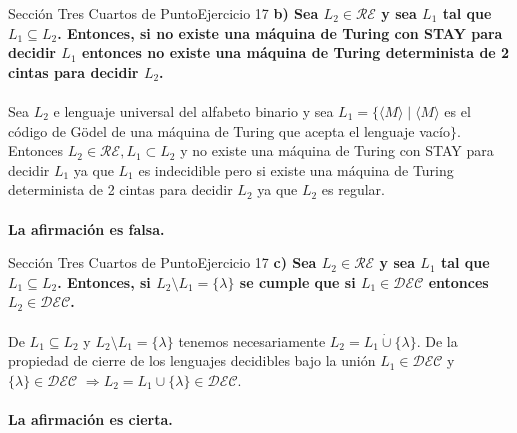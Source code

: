 \documentclass[10pt, envcountsect, presentation, aspectratio=169]{beamer}
\newcommand{\ld}{\ensuremath{\mathcal {DEC}}}
\newcommand{\lr}{\ensuremath{\mathcal {RE}}}
\begin{document}
\begin{frame}{Sección Tres Cuartos de Punto}{Ejercicio 17}
    \textbf{b) Sea $L_2 \in \lr$ y sea $L_1$ tal que $L_1 \subseteq L_2$. Entonces, si no  existe una máquina de Turing con  STAY para decidir $L_1$ entonces no existe una máquina de Turing determinista de 2 cintas para decidir $L_2$.}\\~\\

    Sea $L_2$ e lenguaje universal del alfabeto binario y sea $L_1=\{ \langle M \rangle \mid \langle M \rangle$ es el código de Gödel de una máquina de Turing que acepta el lenguaje vacío$\}$.
    Entonces $L_2 \in \mathcal{RE}, L_1 \subset L_2$ y no existe una máquina de Turing con STAY para decidir $L_1$ ya que $L_1$ es indecidible pero si existe una máquina de Turing determinista de 2 cintas para decidir $L_2$ ya que $L_2$ es regular.\\~\\

    \textbf{La afirmación es falsa.}
\end{frame}


\begin{frame}{Sección Tres Cuartos de Punto}{Ejercicio 17}
    \textbf{c) Sea $L_2 \in \lr$ y sea $L_1$ tal que $L_1 \subseteq L_2$. Entonces, si $L_2 \setminus L_1=\{\lambda\}$ se cumple que si $L_1 \in \ld$ entonces $L_2 \in \ld$.}\\~\\

    De $L_1 \subseteq L_2$ y $L_2 \setminus L_1 = \{\lambda\}$ tenemos necesariamente $L_2 = L_1 \dot{\cup} \{\lambda\}$.
    De la propiedad de cierre de los lenguajes decidibles bajo la unión $L_1 \in \mathcal{DEC}$ y $\{\lambda\} \in \mathcal{DEC}$ $\Rightarrow L_2 = L_1 \cup \{\lambda\} \in \mathcal{DEC}.$\\~\\

    \textbf{La afirmación es cierta.}

\end{frame}

\end{document}
